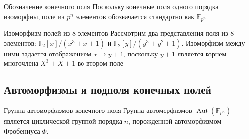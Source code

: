 \begin{Remark}{Обозначение конечного поля}{}
	Поскольку конечные поля одного порядка изоморфны, поле из $p^n$ элементов обозначается стандартно как $\mathbb{F}_{p^n}$.
\end{Remark}

\begin{Example}{Изоморфизм полей из 8 элементов}{}
	Рассмотрим два представления поля из 8 элементов: $\mathbb{F}_2[x]/(x^3+x+1)$ и $\mathbb{F}_2[y]/(y^3+y^2+1)$. Изоморфизм между ними задается отображением $x \mapsto y+1$, поскольку $y+1$ является корнем многочлена $X^3+X+1$ во втором поле.
\end{Example}

\subsection{Автоморфизмы и подполя конечных полей}

\begin{Theorem}{Группа автоморфизмов конечного поля}{}
	Группа автоморфизмов $\operatorname{Aut}(\mathbb{F}_{p^n})$ является циклической группой порядка $n$, порожденной автоморфизмом Фробениуса $\Phi$.
\end{Theorem}

